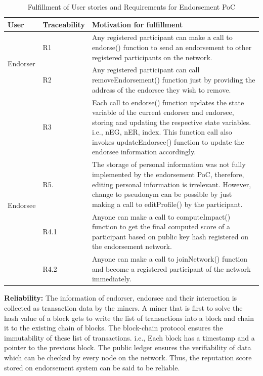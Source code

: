\begin{center} \label{table:fulfillment} 
	\begin{table}
		\begin{tabular} {| l | l | p{9cm} | }
		\hline
		\textbf{User}  & \textbf{Traceability}   & \textbf{Motivation for fulfillment} \\
		\hline
		\multirow{2}{*}{Endorser} & R1 & Any registered participant can make a
		call to endorse() function to send an endorsement to other registered
		participants on the network.      
		\\\cline{2-3} 
		& R2  & Any registered participant can call removeEndorsement()
		function just by providing the address of the endorsee they wish to
		remove.  \\\cline{2-3}
		& R3 & Each call to endorse() function updates the state variable of
		the current endorser and endorsee, storing and updating the respective
		state variables. i.e., nEG, nER, index. This function call also invokes
		updateEndorsee() function to update the endorsee information
		accordingly.  \\\cline{2-3}
		\hline
		\multirow{2}{*}{Endorsee} & R5.& The storage of personal information
		was not fully implemented by the endorsement PoC, therefore, editing
		personal information is irrelevant. However, change to pseudonym can be
		possible by just making a call to editProfile() by the participant.
		\\\cline{2-3}
		\hline
		\multirow{2}{*}{other users} & R4.1 & Anyone can make a call to
		computeImpact() function to get the final computed score of a
		participant based on public key hash registered on the endorsement
		network. \\\cline{2-3}
		& R4.2 &  Anyone can make a call to joinNetwork() function and become a
		registered participant of the network immediately.  \\\cline{2-3}
		\hline
	\end{tabular}
	\caption{Fulfillment of User stories and Requirements for Endorsement PoC}
\end{table}
\end{center}

\textbf{Reliability:}
The information of endorser, endorsee and their interaction is collected as
transaction data by the miners. A miner that is first to solve the hash value
of a block gets to write the list of transactions into a block and chain it to
the existing chain of blocks. The block-chain protocol ensures the immutability
of these list of transactions. i.e., Each block has a timestamp and a pointer
to the previous block. The public ledger ensures the verifiability of data
which can be checked by every node on the network.  Thus, the reputation score
stored on endorsement system can be said to be reliable. \\


